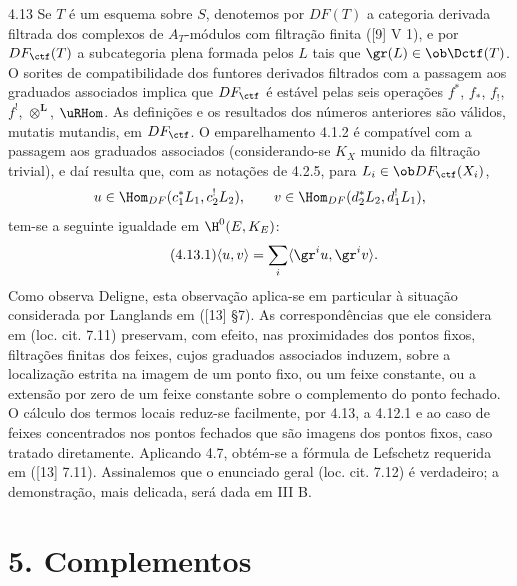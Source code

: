 \begin{statement}{4.13}
Se $T$ é um esquema sobre $S$, denotemos por $DF(T)$ a categoria derivada filtrada dos complexos de $A_T$-módulos com filtração finita ([9] V 1), e por $DF_{\ctf}(T)$ a subcategoria plena formada pelos $L$ tais que $\gr(L)\in\ob\Dctf(T)$. O sorites de compatibilidade dos funtores derivados filtrados com a passagem aos graduados associados implica que $DF_{\ctf}$ é estável pelas seis operações $f^*$, $f_*$, $f_!$, $f^!$, $\otimes^{\mathbf L}$, $\uRHom$. As definições e os resultados dos números anteriores são válidos, mutatis mutandis, em $DF_{\ctf}$. O emparelhamento 4.1.2 é compatível com a passagem aos graduados associados (considerando-se $K_X$ munido da filtração trivial), e daí resulta que, com as notações de 4.2.5, para $L_i\in\ob DF_{\ctf}(X_i)$,
\[
u\in\Hom_{DF}(c_1^*L_1,c_2^!L_2),\qquad
v\in\Hom_{DF}(d_2^*L_2,d_1^!L_1),
\]
tem-se a seguinte igualdade em $\H^0(E,K_E)$:
\begin{equation}
\tag{4.13.1}
\langle u,v\rangle=\sum_i\langle \gr^i u,\gr^i v\rangle.
\end{equation}
Como observa Deligne, esta observação aplica-se em particular à situação considerada por Langlands em ([13] §7). As correspondências que ele considera em (loc. cit. 7.11) preservam, com efeito, nas proximidades dos pontos fixos, filtrações finitas dos feixes, cujos graduados associados induzem, sobre a localização estrita na imagem de um ponto fixo, ou um feixe constante, ou a extensão por zero de um feixe constante sobre o complemento do ponto fechado. O cálculo dos termos locais reduz-se facilmente, por 4.13, a 4.12.1 e ao caso de feixes concentrados nos pontos fechados que são imagens dos pontos fixos, caso tratado diretamente. Aplicando 4.7, obtém-se a fórmula de Lefschetz requerida em ([13] 7.11). Assinalemos que o enunciado geral (loc. cit. 7.12) é verdadeiro; a demonstração, mais delicada, será dada em III B.
\end{statement}



\section*{5. Complementos}
